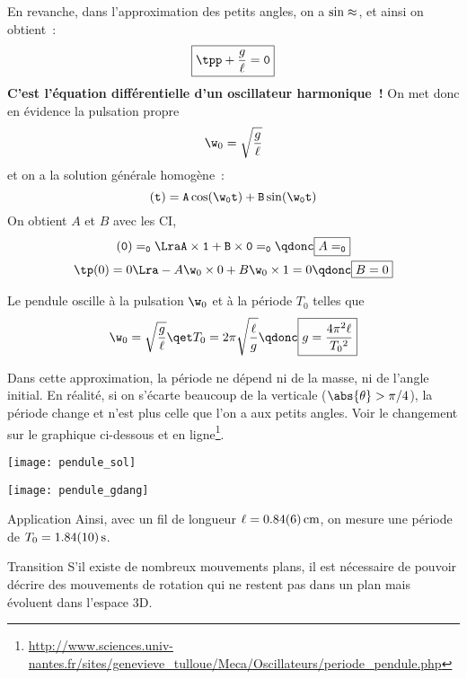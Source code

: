 \documentclass[../main/main.tex]{subfiles}
\begin{document}
En revanche, dans l'approximation des petits angles, on a $\sin\tt\approx\tt$,
et ainsi on obtient~:
\[\boxed{\tpp + \frac{g}{\ell}\tt = 0}\]
\textbf{C'est l'équation différentielle d'un oscillateur harmonique~!} On met
donc en évidence la pulsation propre
\[\w_0 = \sqrt{\frac{g}{\ell}}\]
et on a la solution générale homogène~:
\[\tt(t) = A\cos(\w_0t) + B\sin(\w_0t)\]
On obtient $A$ et $B$ avec les CI,
\begin{gather*}
	\tt(0) = \tt_0
	\Lra A\times 1 + B\times 0 = \tt_0
	\qdonc
	\boxed{A = \tt_0}\\
	\tp(0) = 0
	\Lra -A\w_0\times 0 + B\w_0\times 1 = 0
	\qdonc
	\boxed{B = 0}
\end{gather*}

Le pendule oscille à la pulsation $\w_0$ et à la période $T_0$ telles que
\[
	\w_0 = \sqrt{\frac{g}{\ell}}
	\qet
	T_0 = 2\pi \sqrt{\frac{\ell}{g}}
	\qdonc
	\boxed{g = \frac{4\pi^2\ell}{T_0{}^2}}
\]

Dans cette approximation, la période ne dépend ni de la masse, ni de l'angle
initial. En réalité, si on s'écarte beaucoup de la verticale ($\abs{\theta} >
	\pi/4$), la période change et n'est plus celle que l'on a aux petits angles.
Voir le changement sur le graphique ci-dessous et en
ligne\footnote{\url{http://www.sciences.univ-nantes.fr/sites/genevieve_tulloue/Meca/Oscillateurs/periode_pendule.php}}.

\begin{minipage}{0.45\linewidth}
	\begin{center}
		\texttt{[image: pendule\_sol]}
	\end{center}
\end{minipage}
\hfill
\begin{minipage}{0.45\linewidth}
	\begin{center}
		\texttt{[image: pendule\_gdang]}
	\end{center}
\end{minipage}

\begin{rexem}{Application}
	Ainsi, avec un fil de longueur $\ell = \SI{0.84\pm0.06}{cm}$, on mesure une
	période de $T_0 = \SI{1.84\pm0.1}{s}$. \smallbreak
\end{rexem}

\begin{instruc}[trans]{Transition}
	S'il existe de nombreux mouvements plans, il est nécessaire de pouvoir
	décrire des mouvements de rotation qui ne restent pas dans un plan mais
	évoluent dans l'espace 3D.
\end{instruc}
\end{document}
